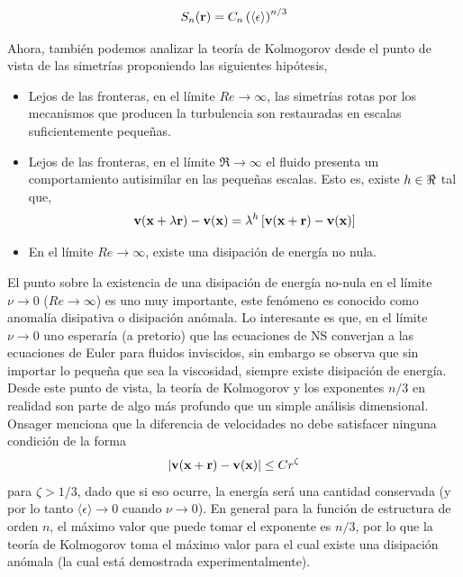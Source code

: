 \documentclass[executivepaper,12pt]{article}
\numberwithin{equation}{section}
\providecommand{\abs}[1]{\lvert#1\rvert}
\begin{document}
\begin{equation*}
	S_n(\vb{r})=C_n\left(\langle\epsilon\rangle\right)^{n/3}
\end{equation*}


Ahora, también podemos analizar la teoría de Kolmogorov desde el punto de vista de las simetrías proponiendo las siguientes hipótesis,

\begin{itemize}
	\item Lejos de las fronteras, en el límite $Re\to \infty$, las simetrías rotas por los mecanismos que producen la turbulencia son restauradas en escalas suficientemente pequeñas.
	\item Lejos de las fronteras, en el límite $\Re\to\infty$ el fluido presenta un comportamiento autisimilar en las pequeñas escalas. Esto es, existe $h \in \real$ tal que,
	\begin{equation*}
		\vb{v}(\vb{x}+\lambda \vb{r})-\vb{v}(\vb{x})=\lambda^h \left[\vb{v}(\vb{x}+\vb{r})-\vb{v}(\vb{x})\right]
	\end{equation*}
	
	\item En el límite $Re \to \infty$, existe una disipación de energía no nula. 
\end{itemize}

El punto sobre la existencia de una disipación de energía no-nula en el límite $\nu\to 0$ ($Re\to \infty$) es uno muy importante, este fenómeno es conocido como anomalía disipativa o disipación anómala. Lo interesante es que, en el límite $\nu\to 0$ uno esperaría (a pretorio) que las ecuaciones de NS converjan a las ecuaciones de Euler para fluidos inviscidos, sin embargo se observa que sin importar lo pequeña que sea la viscosidad, siempre existe disipación de energía. \\
Desde este punto de vista, la teoría de Kolmogorov y los exponentes $n/3$ en realidad son parte de algo más profundo que un simple análisis dimensional. Onsager \parencite{onsager1949,eyink2006} menciona que la diferencia de velocidades no debe satisfacer ninguna condición de la forma 
\begin{equation*}
	\abs{\vb{v}(\vb{x}+\vb{r})-\vb{v}(\vb{x})}\le C r^\zeta
\end{equation*}
para $\zeta>1/3$, dado que si eso ocurre, la energía será una cantidad conservada (y por lo tanto $\langle \epsilon\rangle\to 0$ cuando $\nu\to 0$). En general para la función de estructura de orden $n$, el máximo valor que puede tomar el exponente es $n/3$, por lo que la teoría de Kolmogorov toma el máximo valor para el cual existe una disipación anómala (la cual está demostrada experimentalmente).\\
\end{document}
